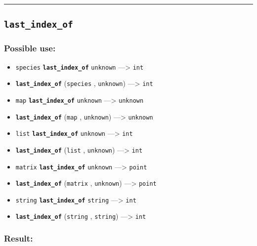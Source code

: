 \documentclass[]{book}
\providecommand{\tightlist}{%
  \setlength{\itemsep}{0pt}\setlength{\parskip}{0pt}}
\theoremstyle{definition}
\theoremstyle{definition}
\theoremstyle{definition}
\theoremstyle{remark}
\begin{document}
\begin{center}\rule{0.5\linewidth}{\linethickness}\end{center}

\subsection{\texorpdfstring{\texttt{last\_index\_of}}{last\_index\_of}}\label{last_index_of}

\subsubsection{Possible use:}\label{possible-use-317}

\begin{itemize}
\tightlist
\item
  \texttt{species} \textbf{\texttt{last\_index\_of}} \texttt{unknown}
  ---\textgreater{} \texttt{int}
\item
  \textbf{\texttt{last\_index\_of}} (\texttt{species} ,
  \texttt{unknown}) ---\textgreater{} \texttt{int}
\item
  \texttt{map} \textbf{\texttt{last\_index\_of}} \texttt{unknown}
  ---\textgreater{} \texttt{unknown}
\item
  \textbf{\texttt{last\_index\_of}} (\texttt{map} , \texttt{unknown})
  ---\textgreater{} \texttt{unknown}
\item
  \texttt{list} \textbf{\texttt{last\_index\_of}} \texttt{unknown}
  ---\textgreater{} \texttt{int}
\item
  \textbf{\texttt{last\_index\_of}} (\texttt{list} , \texttt{unknown})
  ---\textgreater{} \texttt{int}
\item
  \texttt{matrix} \textbf{\texttt{last\_index\_of}} \texttt{unknown}
  ---\textgreater{} \texttt{point}
\item
  \textbf{\texttt{last\_index\_of}} (\texttt{matrix} , \texttt{unknown})
  ---\textgreater{} \texttt{point}
\item
  \texttt{string} \textbf{\texttt{last\_index\_of}} \texttt{string}
  ---\textgreater{} \texttt{int}
\item
  \textbf{\texttt{last\_index\_of}} (\texttt{string} , \texttt{string})
  ---\textgreater{} \texttt{int}
\end{itemize}

\subsubsection{Result:}\label{result-307}
\end{document}
